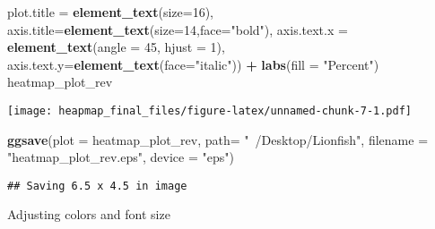 \documentclass[]{article}
\newenvironment{Shaded}{\begin{snugshade}}{\end{snugshade}}
\newcommand{\KeywordTok}[1]{\textcolor[rgb]{0.13,0.29,0.53}{\textbf{#1}}}
\newcommand{\DataTypeTok}[1]{\textcolor[rgb]{0.13,0.29,0.53}{#1}}
\newcommand{\DecValTok}[1]{\textcolor[rgb]{0.00,0.00,0.81}{#1}}
\newcommand{\StringTok}[1]{\textcolor[rgb]{0.31,0.60,0.02}{#1}}
\newcommand{\OperatorTok}[1]{\textcolor[rgb]{0.81,0.36,0.00}{\textbf{#1}}}
\newcommand{\NormalTok}[1]{#1}
\begin{document}
\begin{Shaded}
\begin{Highlighting}[]
        \DataTypeTok{plot.title =} \KeywordTok{element_text}\NormalTok{(}\DataTypeTok{size=}\DecValTok{16}\NormalTok{),}
        \DataTypeTok{axis.title=}\KeywordTok{element_text}\NormalTok{(}\DataTypeTok{size=}\DecValTok{14}\NormalTok{,}\DataTypeTok{face=}\StringTok{"bold"}\NormalTok{),}
        \DataTypeTok{axis.text.x =} \KeywordTok{element_text}\NormalTok{(}\DataTypeTok{angle =} \DecValTok{45}\NormalTok{, }\DataTypeTok{hjust =} \DecValTok{1}\NormalTok{),}
\DataTypeTok{axis.text.y=}\KeywordTok{element_text}\NormalTok{(}\DataTypeTok{face=}\StringTok{"italic"}\NormalTok{)) }\OperatorTok{+}
\StringTok{  }\KeywordTok{labs}\NormalTok{(}\DataTypeTok{fill =} \StringTok{"Percent"}\NormalTok{)}
\NormalTok{heatmap_plot_rev}
\end{Highlighting}
\end{Shaded}

\texttt{[image: heapmap\_final\_files/figure-latex/unnamed-chunk-7-1.pdf]}

\begin{Shaded}
\begin{Highlighting}[]
\KeywordTok{ggsave}\NormalTok{(}\DataTypeTok{plot =}\NormalTok{ heatmap_plot_rev, }\DataTypeTok{path=} \StringTok{"~/Desktop/Lionfish"}\NormalTok{, }\DataTypeTok{filename =} \StringTok{"heatmap_plot_rev.eps"}\NormalTok{, }\DataTypeTok{device =} \StringTok{"eps"}\NormalTok{)}
\end{Highlighting}
\end{Shaded}

\begin{verbatim}
## Saving 6.5 x 4.5 in image
\end{verbatim}

Adjusting colors and font size
\end{document}
